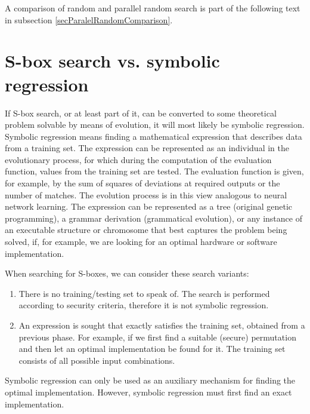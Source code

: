 A comparison of random and parallel random search
is part of the following text in subsection \ref{secParalelRandomComparison}.

\section{S-box search vs. symbolic regression}
If S-box search, or at least part of it, can be
converted to some theoretical problem solvable by means of
evolution, it will most likely be symbolic regression.
Symbolic regression means finding a mathematical expression that describes data from a training
set. The expression can be represented as an individual in the evolutionary process, for which
during the computation of the evaluation function, values from the training set are tested.
The evaluation function is given, for example, by the sum of squares of deviations at required outputs or
the number of matches.
The evolution process is in this view analogous to neural network learning.
The expression can be represented as a tree (original genetic programming),
a grammar derivation (grammatical evolution), or any instance of an executable structure
or chromosome that best captures the problem being solved,
if, for example, we are looking for an optimal hardware
or software implementation.

When searching for S-boxes, we can consider these search variants:
\begin{enumerate}
  \item There is no training/testing set to speak of.
    The search is performed according to security criteria, therefore it is not symbolic regression.
  \item An expression is sought that exactly satisfies the training set, obtained from a previous phase.
  For example, if we first find a suitable (secure) permutation
  and then let an optimal implementation be found for it.
  The training set consists of all possible input combinations.
\end{enumerate}

Symbolic regression can only be used as an auxiliary mechanism for finding the optimal
implementation. However, symbolic regression must first find an exact implementation.
